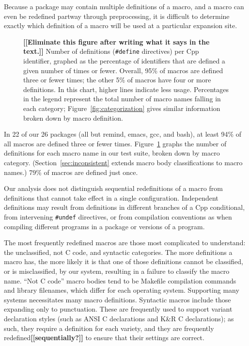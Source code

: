 \documentclass[10pt]{article}
\newcommand{\comment}[1]{\textbf{[[#1]]}}
\newcommand{\pkg}[1]{\textsf{#1}}
\newcommand{\captionsmall}[1]{\caption[]{\small #1}}
\begin{document}
Because a package may contain multiple definitions of a macro, and a macro
can even be redefined partway through preprocessing, it is difficult to
determine exactly which definition of a macro will be used at a particular
expansion site.

\begin{figure}
\centerline{}
\captionsmall{\comment{Eliminate this figure after writing what it says in
    the text.}
  Number of definitions ({\tt \#define} directives) per Cpp
  identifier, graphed as the percentage of identifiers that are defined a
  given number of times or fewer.  Overall, 95\% of macros are defined
  three or fewer times; the other 5\% of macros have four or more
  definitions.  In this chart, higher lines indicate less usage.
  Percentages in the legend represent the total number of
  macro names falling in each category; Figure~\ref{fig:categorization}
  gives similar information broken down by macro definition.}
\label{fig:freq-def-cat}
\end{figure}

In 22 of our 26 packages (all but \pkg{remind}, \pkg{emacs}, \pkg{gcc}, and
\pkg{bash}), at least 94\% of all macros are defined three or fewer times.
Figure~\ref{fig:freq-def-cat} graphs the number of definitions for each
macro name in our test suite, broken down by macro category.
(Section~\ref{sec:inconsistent} extends
macro body classifications to macro names.)  79\% of macros are defined just once.

Our analysis does not distinguish sequential redefinitions of a macro from definitions that cannot take effect in a single configuration.
Independent definitions may result from definitions in different branches
of a Cpp conditional, from intervening {\tt \#undef} directives, or from
compilation conventions as when compiling different programs in a package
or versions of a program.


The most frequently redefined macros are those most complicated to
understand: the unclassified, not C code, and syntactic categories.  The
more definitions a macro has, the more likely it is that one of those
definitions cannot be classified, or is misclassified, by our system,
resulting in a failure to classify the macro name.  ``Not C code'' macro
bodies tend to be Makefile compilation commands and library filenames,
which differ for each operating system.  Supporting many systems
necessitates many macro definitions.  Syntactic macros include those
expanding only to punctuation.  These are frequently used to support
variant declaration styles (such as ANSI C declarations and K\&R C
declarations); as such, they require a definition for each
variety, and they are frequently redefined\comment{sequentially?} to ensure that their settings
are correct.
\end{document}
